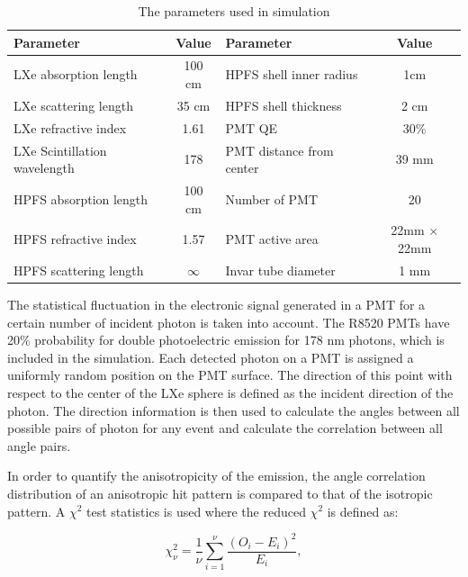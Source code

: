 \begin{table}[h]
  \centering
  \caption{The parameters used in simulation}
  \label{tab:OptPar}
  \begin{tabular}{|l c||l c|}
  \hline
  Parameter & Value & Parameter & Value \\
  \hline
  LXe absorption length & 100 cm & HPFS shell inner radius & 1cm \\
  LXe scattering length & 35 cm & HPFS shell thickness & 2 cm\\
  LXe refractive index & 1.61  & PMT QE &  30\% \\
  LXe Scintillation wavelength & 178& PMT distance from center & 39 mm\\
  HPFS absorption length & 100 cm  & Number of PMT & 20 \\
  HPFS refractive index & 1.57 & PMT active area & 22mm $\times$ 22mm \\
  HPFS scattering length & $\infty$ & Invar tube diameter & 1 mm\\
  \hline
 \end{tabular}
\end{table}


The statistical fluctuation 
in the electronic signal generated in a PMT for a certain number of incident photon is 
taken into account. The R8520 PMTs have 20\% probability 
for double photoelectric emission for 178 nm photons, which is included in the simulation.
Each detected photon on a PMT is assigned a uniformly random position on the PMT surface. 
The direction of this point with respect 
to the center of the LXe sphere is defined as the incident direction of the photon. The direction information 
is then used to calculate the angles between all possible pairs of photon for any event and 
calculate the correlation between all angle pairs. 

In order to quantify the anisotropicity of the emission, 
the angle correlation distribution of an anisotropic hit pattern is compared to that of the isotropic 
pattern. A $\chi^2$ test statistics is used where the reduced $\chi^2$ is defined as: 

\begin{equation}
\chi^2_\nu = \frac{1}{\nu} \sum^{\nu}_{i=1} \frac{(O_i - E_i)^2}{E_i},
\label{redchi2}
\end{equation}


